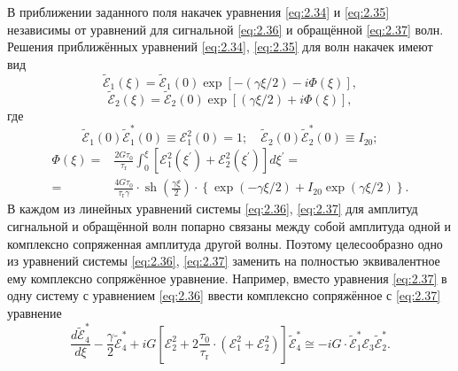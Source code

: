 В приближении заданного поля накачек уравнения \eqref{eq:2.34} и \eqref{eq:2.35} независимы
от уравнений для сигнальной \eqref{eq:2.36} и обращённой \eqref{eq:2.37} волн. Решения приближённых уравнений \eqref{eq:2.34}, \eqref{eq:2.35} для волн накачек имеют вид
\begin{equation}
	\label{eq:2.38}
	\tilde{\mathcal{E}}_{1}(\xi)=\tilde{\mathcal{E}}_{1}(0) \exp [-(\gamma \xi / 2)-i \Phi(\xi)],
\end{equation}
\begin{equation}
	\label{eq:2.39}
	\tilde{\mathcal{E}}_{2}(\xi)=\tilde{\mathcal{E}}_{2}(0) \exp [(\gamma \xi / 2)+i \Phi(\xi)],
\end{equation}
где
\begin{equation}
	\label{eq:2.40}
	\tilde{\mathcal{E}}_{1}(0) \tilde{\mathcal{E}}_{1}^*(0) \equiv \mathcal{E}_{1}^{2}(0)=1 ; \quad \tilde{\mathcal{E}}_{2}(0) \tilde{\mathcal{E}}_{2}^{*}(0) \equiv I_{20};
\end{equation}
\begin{equation}
	\label{eq:2.41}
	\begin{aligned}
	\Phi(\xi)=&\frac{2 G \tau_{0}}{\tau_{\mathrm{r}}} \int_{0}^\xi\left[\mathcal{E}_{1}^{2}\left(\xi^{\prime}\right)+\mathcal{E}_{2}^{2}\left(\xi^{\prime}\right)\right] d \xi^{\prime}= \\
	=&\frac{4 G \tau_{0}}{\tau_{\mathrm{r}} \gamma} \cdot \operatorname{sh}\left(\frac{\gamma \xi}{ 2}\right) \cdot\left\{\exp (-\gamma \xi / 2)+I_{20} \exp (\gamma \xi / 2)\right\}.
	\end{aligned}
\end{equation}
В каждом из линейных уравнений системы \eqref{eq:2.36}, \eqref{eq:2.37} для амплитуд сигнальной
и обращённой волн попарно связаны между собой амплитуда одной и комплексно сопряженная амплитуда другой волны. Поэтому целесообразно одно из
уравнений системы \eqref{eq:2.36}, \eqref{eq:2.37} заменить на полностью эквивалентное ему комплексно сопряжённое уравнение. Например, вместо уравнения \eqref{eq:2.37} в одну систему с уравнением \eqref{eq:2.36} ввести комплексно сопряжённое с \eqref{eq:2.37} уравнение
\begin{equation}
	\label{eq:2.42}
	\frac{d \tilde{\mathcal{E}}_{4}^*}{d \xi}-\frac{\gamma}{2} \tilde{\mathcal{E}}_{4}^*+i G\left[\mathcal{E}_{2}^{2}+2 \frac{\tau_{0}}{\tau_{\mathrm{r}}} \cdot\left({\mathcal { E }}_{1}^{2}+{\mathcal { E }}_{2}^{2}\right)\right] \tilde{\mathcal{E}}_{4}^* \cong-i G \cdot \tilde{\mathcal{E}}_{1}^* {\mathcal { E }}_{3} \tilde{\mathcal{E}}_{2}^*.
\end{equation}
